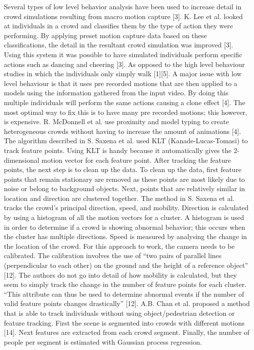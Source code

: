 \documentclass[conference]{IEEEtran}
\begin{document}
Several types of low level behavior analysis have been used to increase detail in crowd simulations resulting from macro motion capture [3]. K. Lee et al. looked at individuals in a crowd and classifies them by the type of action they were performing. By applying preset motion capture data based on these classifications, the detail in the resultant crowd simulation was improved [3]. 
Using this system it was possible to have simulated individuals perform specific actions such as dancing and cheering [3]. As opposed to the high level behaviour studies in which the individuals only simply walk [1][5].
A major issue with low level behaviour is that it uses pre recorded motions that are then applied to a models using the information gathered from the input video. By doing this multiple individuals will perform the same actions causing a clone effect [4]. The most optimal way to fix this is to have many pre recorded motions; this however, is expensive. R. McDonnell et al. use proximity and model typing to create heterogeneous crowds without having to increase the amount of animations [4].
The algorithm described in S. Saxena et al. used KLT (Kanade-Lucas-Tomasi) to track feature points. Using KLT is handy because it automatically gives the 2-dimensional motion vector for each feature point. After tracking the feature points, the next step is to clean up the data. To clean up the data, first feature points that remain stationary are removed as these points are most likely due to noise or belong to background objects. Next, points that are relatively similar in location and direction are clustered together.
The method in S. Saxena et al. tracks the crowd’s principal direction, speed, and mobility. Direction is calculated by using a histogram of all the motion vectors for a cluster. A histogram is used in order to determine if a crowd is showing abnormal behavior; this occurs when the cluster has multiple directions. Speed is measured by analysing the change in the location of the crowd. For this approach to work, the camera needs to be calibrated. The calibration involves the use of “two pairs of parallel lines (perpendicular to each other) on the ground and the height of a reference object” [12]. The authors do not go into detail of how mobility is calculated, but they seem to simply track the change in the number of feature points for each cluster. “This attribute can thus be used to determine abnormal events if the number of valid feature points changes drastically” [12].
A.B. Chan et al. proposed a method that is able to track individuals without using  object/pedestrian detection or feature tracking. First the scene is segmented into crowds with different motions [14]. Next features are extracted from each crowd segment. Finally, the number of people per segment is estimated with Gaussian process regression.
\end{document}

